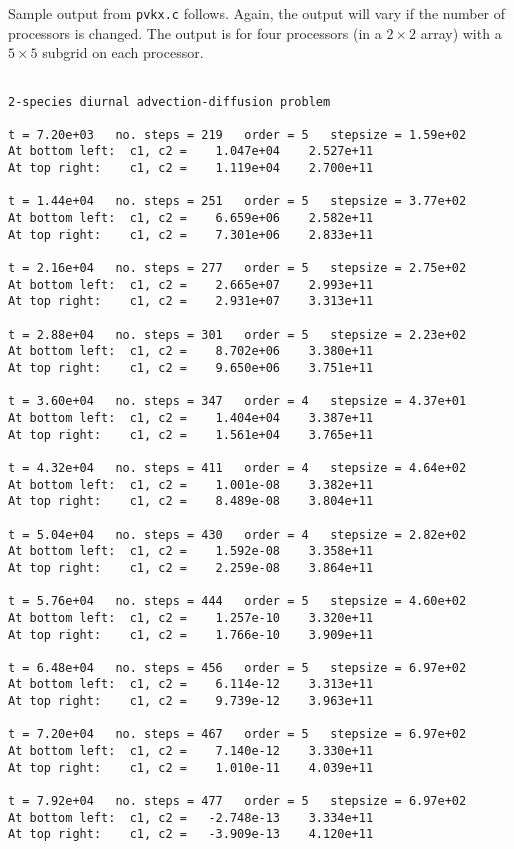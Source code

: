 Sample output from {\tt pvkx.c} follows. Again, the output will vary if the
number of processors is changed. The output is for four processors (in a $2
\times 2$ array) with a $5 \times 5$ subgrid on each processor.

\begin{verbatim}

2-species diurnal advection-diffusion problem

t = 7.20e+03   no. steps = 219   order = 5   stepsize = 1.59e+02
At bottom left:  c1, c2 =    1.047e+04    2.527e+11 
At top right:    c1, c2 =    1.119e+04    2.700e+11 

t = 1.44e+04   no. steps = 251   order = 5   stepsize = 3.77e+02
At bottom left:  c1, c2 =    6.659e+06    2.582e+11 
At top right:    c1, c2 =    7.301e+06    2.833e+11 

t = 2.16e+04   no. steps = 277   order = 5   stepsize = 2.75e+02
At bottom left:  c1, c2 =    2.665e+07    2.993e+11 
At top right:    c1, c2 =    2.931e+07    3.313e+11 

t = 2.88e+04   no. steps = 301   order = 5   stepsize = 2.23e+02
At bottom left:  c1, c2 =    8.702e+06    3.380e+11 
At top right:    c1, c2 =    9.650e+06    3.751e+11 

t = 3.60e+04   no. steps = 347   order = 4   stepsize = 4.37e+01
At bottom left:  c1, c2 =    1.404e+04    3.387e+11 
At top right:    c1, c2 =    1.561e+04    3.765e+11 

t = 4.32e+04   no. steps = 411   order = 4   stepsize = 4.64e+02
At bottom left:  c1, c2 =    1.001e-08    3.382e+11 
At top right:    c1, c2 =    8.489e-08    3.804e+11 

t = 5.04e+04   no. steps = 430   order = 4   stepsize = 2.82e+02
At bottom left:  c1, c2 =    1.592e-08    3.358e+11 
At top right:    c1, c2 =    2.259e-08    3.864e+11 

t = 5.76e+04   no. steps = 444   order = 5   stepsize = 4.60e+02
At bottom left:  c1, c2 =    1.257e-10    3.320e+11 
At top right:    c1, c2 =    1.766e-10    3.909e+11 

t = 6.48e+04   no. steps = 456   order = 5   stepsize = 6.97e+02
At bottom left:  c1, c2 =    6.114e-12    3.313e+11 
At top right:    c1, c2 =    9.739e-12    3.963e+11 

t = 7.20e+04   no. steps = 467   order = 5   stepsize = 6.97e+02
At bottom left:  c1, c2 =    7.140e-12    3.330e+11 
At top right:    c1, c2 =    1.010e-11    4.039e+11 

t = 7.92e+04   no. steps = 477   order = 5   stepsize = 6.97e+02
At bottom left:  c1, c2 =   -2.748e-13    3.334e+11 
At top right:    c1, c2 =   -3.909e-13    4.120e+11 


\end{verbatim}
